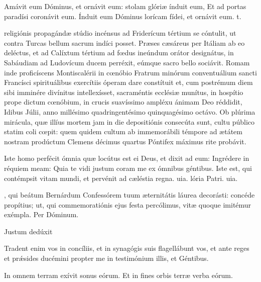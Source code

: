 \documentclass[fontsize=9pt,paper=A6,twoside,BCOR=1mm,DIV=22,headinclude]{scrarticle}
\renewcommand\A{\Ant}
\begin{document}
\begin{multicols}{2}
{\R Amávit eum Dóminus, et ornávit eum: stolam glóriæ índuit eum, \red{*} Et ad portas paradísi coronávit eum.
\V Índuit eum Dóminus lorícam fídei, et ornávit eum. t.

 religiónis propagándæ stúdio incénsus ad Friderícum tértium se cóntulit, ut contra Turcas bellum sacrum indíci posset. Præses cæsáreus per Itáliam ab eo deléctus, et ad Calíxtum tértium ad fœdus ineúndum orátor designátus, in Sabáudiam ad Ludovícum ducem perréxit, eúmque sacro bello sociávit. Romam inde proficíscens Montiscalérii in cœnóbio Fratrum minórum conventuálium sancti Francísci spirituálibus exercítiis óperam dare constítuit et, cum postrémum diem sibi imminére divínitus intellexísset, sacraméntis ecclésiæ munítus, in hospítio prope dictum cœnóbium, in crucis suavíssimo ampléxu ánimam Deo réddidit, Idibus Júlii, anno millésimo quadringentésimo quinquagésimo octávo. Ob plúrima mirácula, quæ illíus mortem jam in die depositiónis consecúta sunt, cultu público statim coli cœpit: quem quidem cultum ab immemorábili témpore ad ætátem nostram prodúctum Clemens décimus quartus Póntifex máximus rite probávit.

}

{
\R Iste homo perfécit ómnia quæ locútus est ei Deus, et dixit ad eum: Ingrédere in réquiem meam: \red{*} Quia te vidi justum coram me ex ómnibus géntibus.
\V Iste est, qui contémpsit vitam mundi, et pervénit ad cæléstia regna. uia. lória Patri. uia.



\VRCii

\BC

, qui beátum Bernárdum Confessórem tuum æternitátis láurea decorásti: concéde propítius; ut, qui commemoratiónis ejus festa percólimus, vitæ quoque imitémur exémpla. Per Dóminum.


\V Justum dedúxit 

\MiiC


\A Tradent enim vos in concíliis, et in synagógis suis flagellábunt vos, et ante reges et prǽsides ducémini propter me in testimónium illis, et Géntibus.

\V In omnem terram exívit sonus eórum.
\R Et in fines orbis terræ verba eórum.

}
\end{multicols}
\end{document}

